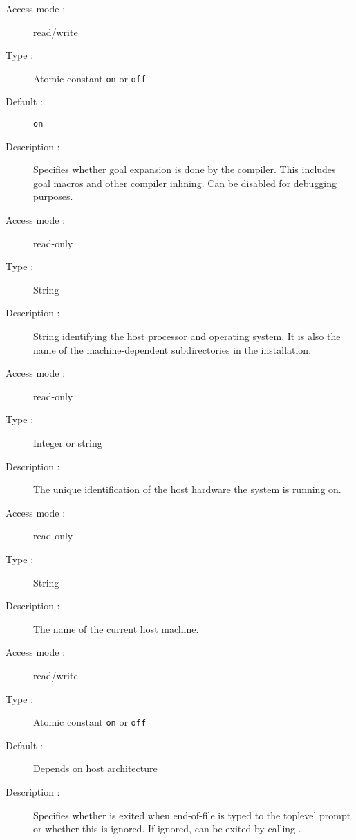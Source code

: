 \begin{description}
\begin{description}
\item[Access mode : ] read/write
\item[Type : ] Atomic constant {\tt on} or {\tt off}
\item[Default : ] {\tt on}
\item[Description : ] Specifies whether goal expansion is done by the compiler.
This includes goal macros and other compiler inlining.
Can be disabled for debugging purposes.
\end{description}

\pagebreak[3]
\begin{description}
\item[Access mode :] read-only
\item[Type :] String
\item[Description :] String identifying the host processor and operating
system. It is also the name of the machine-dependent subdirectories in the
{\eclipse} installation.
\end{description}

\begin{description}
\item[Access mode :] read-only
\item[Type :] Integer or string
\item[Description :] The unique identification of the host hardware
the system is running on.
\end{description}

\begin{description}
\item[Access mode :] read-only
\item[Type :] String
\item[Description :] The name of the current host machine.
\end{description}

\begin{description}
\item[Access mode : ] read/write
\item[Type : ] Atomic constant {\tt on} or {\tt off}
\item[Default : ] Depends on host architecture
\item[Description : ] Specifies whether {\eclipse} is exited
when end-of-file is typed to the toplevel prompt or whether this is ignored.
If ignored, {\eclipse} can be exited by calling
.
\end{description}


\end{description}
